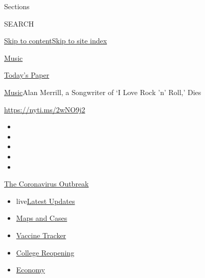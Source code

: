 Sections

SEARCH

\protect\hyperlink{site-content}{Skip to
content}\protect\hyperlink{site-index}{Skip to site index}

\href{https://www.nytimes3xbfgragh.onion/section/arts/music}{Music}

\href{https://myaccount.nytimes3xbfgragh.onion/auth/login?response_type=cookie\&client_id=vi}{}

\href{https://www.nytimes3xbfgragh.onion/section/todayspaper}{Today's
Paper}

\href{/section/arts/music}{Music}\textbar{}Alan Merrill, a Songwriter of
`I Love Rock 'n' Roll,' Dies

\url{https://nyti.ms/2wNO9j2}

\begin{itemize}
\item
\item
\item
\item
\item
\end{itemize}

\href{https://www.nytimes3xbfgragh.onion/news-event/coronavirus?action=click\&pgtype=Article\&state=default\&region=TOP_BANNER\&context=storylines_menu}{The
Coronavirus Outbreak}

\begin{itemize}
\tightlist
\item
  live\href{https://www.nytimes3xbfgragh.onion/2020/08/04/world/coronavirus-covid-19.html?action=click\&pgtype=Article\&state=default\&region=TOP_BANNER\&context=storylines_menu}{Latest
  Updates}
\item
  \href{https://www.nytimes3xbfgragh.onion/interactive/2020/us/coronavirus-us-cases.html?action=click\&pgtype=Article\&state=default\&region=TOP_BANNER\&context=storylines_menu}{Maps
  and Cases}
\item
  \href{https://www.nytimes3xbfgragh.onion/interactive/2020/science/coronavirus-vaccine-tracker.html?action=click\&pgtype=Article\&state=default\&region=TOP_BANNER\&context=storylines_menu}{Vaccine
  Tracker}
\item
  \href{https://www.nytimes3xbfgragh.onion/2020/08/02/us/covid-college-reopening.html?action=click\&pgtype=Article\&state=default\&region=TOP_BANNER\&context=storylines_menu}{College
  Reopening}
\item
  \href{https://www.nytimes3xbfgragh.onion/live/2020/08/03/business/stock-market-today-coronavirus?action=click\&pgtype=Article\&state=default\&region=TOP_BANNER\&context=storylines_menu}{Economy}
\end{itemize}


